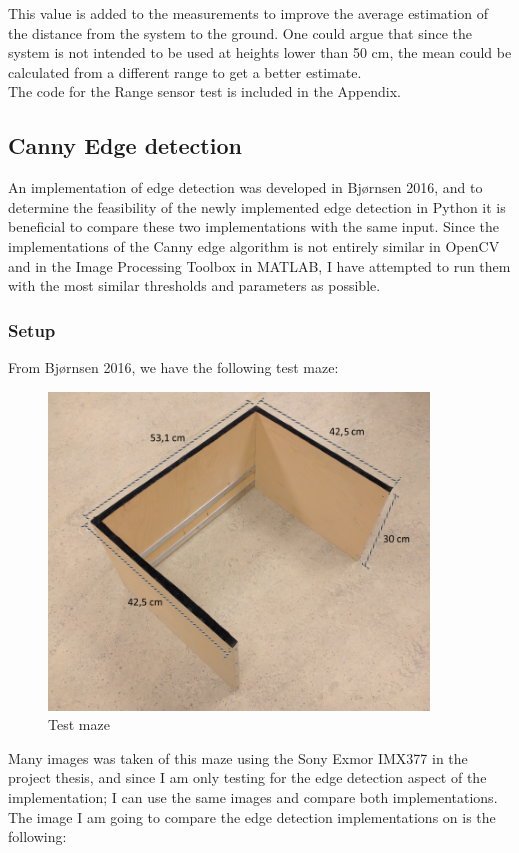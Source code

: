 This value is added to the measurements to improve the average estimation of the distance from the system to the ground. One could argue that since the system is not intended to be used at heights lower than 50 cm, the mean could be calculated from a different range to get a better estimate.\\

The code for the Range sensor test is included in the Appendix.
\newpage


\subsection{Canny Edge detection}
An implementation of edge detection was developed in Bjørnsen 2016\cite{kris}, and to determine the feasibility of the newly implemented edge detection in Python it is beneficial to compare these two implementations with the same input. Since the implementations of the Canny edge algorithm is not entirely similar in OpenCV and in the Image Processing Toolbox in MATLAB, I have attempted to run them with the most similar thresholds and parameters as possible.

\subsubsection{Setup}
From Bjørnsen 2016\cite{kris}, we have the following test maze:
\begin{figure}[H]
\centering
\includegraphics[width=0.9\textwidth]{fig/maze}
  \caption{Test maze}
  \label{fig:maze}
\end{figure}
Many images was taken of this maze using the Sony Exmor IMX377 in the project thesis, and since I am only testing for the edge detection aspect of the implementation; I can use the same images and compare both implementations. The image I am going to compare the edge detection implementations on is the following:

